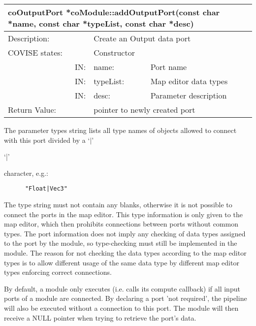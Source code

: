      
\begin{longtable}{|p{4cm}|p{2.5cm}|p{7cm}|}
\hline
\multicolumn{3}{|p{13.5cm}|}{\bf coOutputPort *coModule::addOutputPort(const char *name, 
const char *typeList, const char *desc)} \\
\hline
{Description:}   & 
                       \multicolumn{2}{|p{9.5cm}|}{Create an Output data port} \\
\hline
{COVISE states:} & \multicolumn{2}{|p{9.5cm}|}{Constructor} \\
\hline
\multicolumn{1}{|r|}{IN:}  & {name:} & 
                                  {Port name} \\
\hline
\multicolumn{1}{|r|}{IN:}  & {typeList:} & 
                                  {Map editor data types} \\
\hline
\multicolumn{1}{|r|}{IN:}  & {desc:} & 
                                  {Parameter description} \\
\hline
{Return Value:}   & 
                       \multicolumn{2}{|p{9.5cm}|}{pointer to newly created port} \endhead
\hline
\end{longtable}
	     
The parameter types string lists all type names of objects allowed to connect with this 
port divided by a \latexonly `$\mid$' \endlatexonly \begin{htmlonly} `|'
\end{htmlonly} character, e.g.: 

\begin{verbatim}
      "Float|Vec3"
\end{verbatim}

The type string must not contain any blanks, otherwise it is not possible to connect 
the ports in the map editor. This type information is only given to the map editor, 
which then prohibits connections between ports without common types. The port information
does not imply any checking of data types assigned to the port by the module, so 
type-checking must still be implemented in the module. The reason for not checking the 
data types according to the map editor types is to allow different usage of the same 
data type by different map editor types enforcing correct connections.

By default, a module only executes (i.e. calls its compute callback) if all input ports 
of a module are connected. By declaring a port 'not required', the pipeline will also 
be executed without a connection to this port. The module will then receive a NULL 
pointer when trying to retrieve the port's data.

